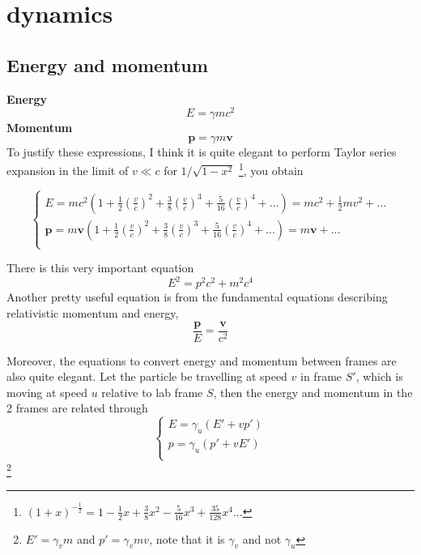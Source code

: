\section{dynamics}
\subsection{Energy and momentum}
\textbf{Energy}
\begin{equation}
    E=\gamma m c^2
\end{equation}
\textbf{Momentum}
\begin{equation}
    \mathbf{p}=\gamma m \mathbf{v}
\end{equation}
To justify these expressions, I think it is quite elegant to perform Taylor series expansion in the limit of $v \ll c$ for $1/\sqrt{1-x^2}$ \footnote{$(1+x)^{-\frac{1}{2}}=1-\frac{1}{2}x+\frac{3}{8}x^2-\frac{5}{16}x^3+\frac{35}{128}x^4...$}, you obtain

\begin{equation}
    \begin{cases}
        E=mc^2(1+\frac{1}{2}(\frac{v}{c})^2+\frac{3}{8}(\frac{v}{c})^3+\frac{5}{16}(\frac{v}{c})^4+...)=mc^2+\frac{1}{2}mv^2+...\\
        \mathbf{p}=m \mathbf{v}(1+\frac{1}{2}(\frac{v}{c})^2+\frac{3}{8}(\frac{v}{c})^3+\frac{5}{16}(\frac{v}{c})^4+...)=m\mathbf{v}+...\\
    \end{cases}
\end{equation}

There is this very important equation
\begin{equation}
    E^2=p^2c^2+m^2c^4
\end{equation}
Another pretty useful equation is from the fundamental equations describing relativistic momentum and energy, 
\begin{equation}
    \frac{\mathbf{p}}{E}=\frac{\mathbf{v}}{c^2}
\end{equation}

Moreover, the equations to convert energy and momentum between frames are also quite elegant. Let the particle be travelling at speed $v$ in frame $S'$, which is moving at speed $u$ relative to lab frame $S$, then the energy and momentum in the 2 frames are related through
\begin{equation}
    \begin{cases}
        E=\gamma_u(E'+vp')\\
        p=\gamma_u(p'+vE')\\
    \end{cases}
\end{equation} \footnote{$E'=\gamma_v m$ and $p'=\gamma_v m v$, note that it is $\gamma_v$ and not $\gamma_u$}

